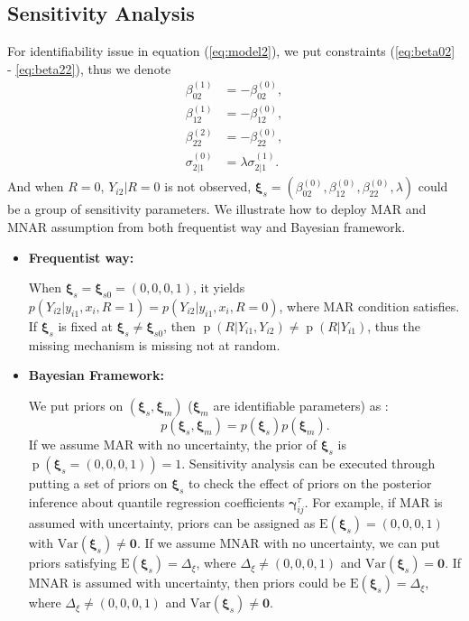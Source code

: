 \documentclass[12pt]{article}
\DeclareMathOperator{\pr}{p}
\begin{document}
\subsection{Sensitivity Analysis}
\label{sec:sa}

For identifiability issue in equation (\ref{eq:model2}), we put
constraints (\ref{eq:beta02} - \ref{eq:beta22}), thus we denote
\begin{align}
  \label{eq:c0}
  \beta_{02}^{(1)} & = - \beta_{02}^{(0)} ,\\
  \label{eq:c1}
  \beta_{12}^{(1)} & = -\beta_{12}^{(0)}, \\
  \label{eq:c2}
  \beta_{22}^{(2)} & = -\beta_{22}^{(0)}, \\
  \label{eq:cs}
  \sigma_{2|1}^{(0)} & = \lambda\sigma_{2|1}^{(1)}.
\end{align}
And when $R = 0$, $Y_{i2}|R = 0$ is not observed, $\bm \xi_s =
(\beta_{02}^{(0)}, \beta_{12}^{(0)}, \beta_{22}^{(0)}, \lambda)$ could
be a group of sensitivity parameters. We illustrate how to deploy MAR
and MNAR assumption from both frequentist way and Bayesian framework.

\begin{itemize}
\item \textbf{Frequentist way: }

  When $\bm \xi_s = \bm \xi_{s0} = (0, 0, 0, 1)$, it yields
  $p(Y_{i2}|y_{i1}, x_i, R = 1) = p(Y_{i2}| y_{i1}, x_i, R = 0)$,
  where MAR condition satisfies. If $\bm \xi_s$ is fixed at $\bm \xi_s
  \neq \bm \xi_{s0}$, then $\pr (R | Y_{i1}, Y_{i2}) \neq \pr (R |
  Y_{i1})$, thus the missing mechanism is missing not at random.
\item \textbf{Bayesian Framework: }

  We put priors on $(\bm \xi_s, \bm \xi_m)$ ($\bm \xi_m$ are
  identifiable parameters) as :
  \begin{displaymath}
    p(\bm \xi_s, \bm \xi_m) = p(\bm \xi_s) p(\bm \xi_m).
  \end{displaymath}
  If we assume MAR with no uncertainty, the prior of $\bm \xi_s$ is
  $\pr(\bm \xi_s = (0, 0, 0, 1)) = 1$. Sensitivity analysis can be
  executed through putting a set of priors on $\bm \xi_s$ to check the
  effect of priors on the posterior inference about quantile
  regression coefficients $\bm \gamma_{ij}^{\tau}$. For example, if
  MAR is assumed with uncertainty, priors can be assigned as
  $\textrm{E}(\bm \xi_s) = (0, 0, 0, 1)$ with $\textrm{Var}(\bm \xi_s)
  \neq \bm 0$. If we assume MNAR with no uncertainty, we can put
  priors satisfying $\textrm{E}(\bm \xi_s) = \Delta_{\xi}$, where
  $\Delta_{\xi} \neq (0, 0, 0, 1)$ and $\textrm{Var}(\bm \xi_s) = \bm
  0$. If MNAR is assumed with uncertainty, then priors could be
  $\textrm{E}(\bm \xi_s) = \Delta_{\xi}$, where $\Delta_{\xi} \neq (0,
  0, 0, 1)$ and $\textrm{Var}(\bm \xi_s) \neq \bm 0$.
\end{itemize}
\end{document}
